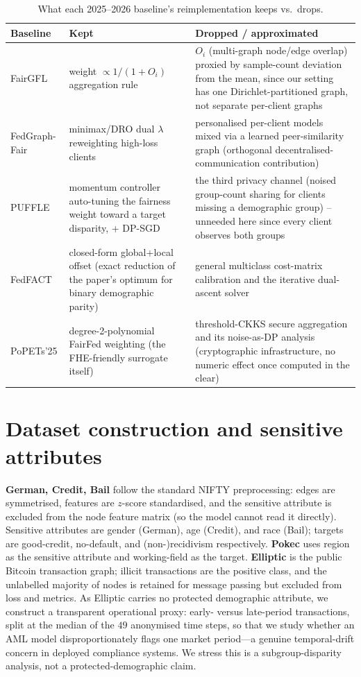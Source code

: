 \documentclass[pdflatex,sn-mathphys-num]{sn-jnl}
\theoremstyle{thmstyleone}%
\theoremstyle{thmstyletwo}%
\theoremstyle{thmstylethree}%
\begin{document}
\begin{appendices}
\begin{table}[h]\centering\small
\caption{What each 2025--2026 baseline's reimplementation keeps vs.\ drops.}
\label{tab:baseline-fidelity}
\begin{tabular}{p{2.1cm}p{4.6cm}p{4.6cm}}
\toprule
Baseline & Kept & Dropped / approximated \\
\midrule
FairGFL & weight $\propto 1/(1{+}O_i)$ aggregation rule & $O_i$ (multi-graph
node/edge overlap) proxied by sample-count deviation from the mean, since our
setting has one Dirichlet-partitioned graph, not separate per-client graphs \\
FedGraph-Fair & minimax/DRO dual $\lambda$ reweighting high-loss clients &
personalised per-client models mixed via a learned peer-similarity graph
(orthogonal decentralised-communication contribution) \\
PUFFLE & momentum controller auto-tuning the fairness weight toward a target
disparity, + DP-SGD & the third privacy channel (noised group-count sharing
for clients missing a demographic group) -- unneeded here since every client
observes both groups \\
FedFACT & closed-form global+local offset (exact reduction of the paper's
optimum for binary demographic parity) & general multiclass cost-matrix
calibration and the iterative dual-ascent solver \\
PoPETs'25 & degree-2-polynomial FairFed weighting (the FHE-friendly surrogate
itself) & threshold-CKKS secure aggregation and its noise-as-DP analysis
(cryptographic infrastructure, no numeric effect once computed in the clear) \\
\bottomrule
\end{tabular}
\end{table}

\section{Dataset construction and sensitive attributes}
\label{app:data}
\textbf{German, Credit, Bail} follow the standard NIFTY preprocessing: edges are
symmetrised, features are $z$-score standardised, and the sensitive attribute is
excluded from the node feature matrix (so the model cannot read it directly).
Sensitive attributes are gender (German), age (Credit), and race (Bail); targets
are good-credit, no-default, and (non-)recidivism respectively. \textbf{Pokec}
uses region as the sensitive attribute and working-field as the target.
\textbf{Elliptic} is the public Bitcoin transaction graph; illicit transactions
are the positive class, and the unlabelled majority of nodes is retained for
message passing but excluded from loss and metrics. As Elliptic carries no
protected demographic attribute, we construct a transparent operational proxy:
early- versus late-period transactions, split at the median of the $49$
anonymised time steps, so that we study whether an AML model disproportionately
flags one market period---a genuine temporal-drift concern in deployed
compliance systems. We stress this is a subgroup-disparity analysis, not a
protected-demographic claim.


\end{appendices}
\end{document}
